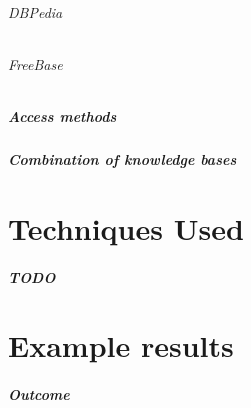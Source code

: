 \documentclass[11pt,titlepage,oneside,openany]{book}
\begin{document}
\subparagraph{DBPedia}
\label{dbpedia}

\subparagraph{FreeBase}
\label{freebase}

\paragraph{Access methods}
\label{sec:access_methods}

\paragraph{Combination of knowledge bases}
\label{sec:dataset_combination}




\chapter{Techniques Used}
\label{cha:technique}

\paragraph{TODO}
\label{sec:TODO}


\chapter{Example results}
\label{cha:example}

\paragraph{Outcome}
\label{sec:outcome}
\end{document}
